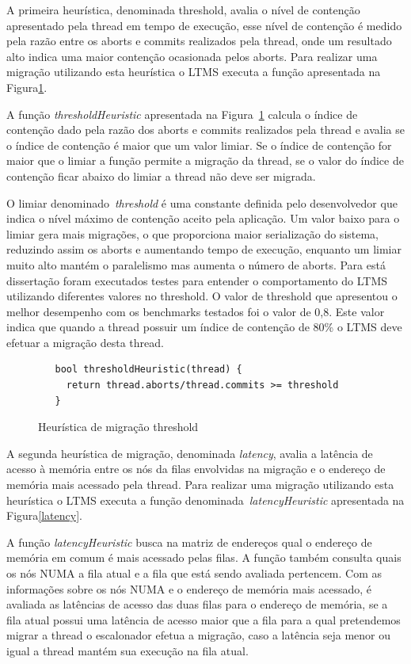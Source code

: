 \documentclass[diss,capa]{texufpel}
\begin{document}
A primeira heurística, denominada threshold, avalia o nível de contenção apresentado pela thread em tempo de execução, esse nível de contenção é medido pela razão entre os aborts e commits realizados pela thread, onde um resultado alto indica uma maior contenção ocasionada pelos aborts. Para realizar uma migração utilizando esta heurística o LTMS executa a função apresentada na Figura\ref{threshold}.

A função \emph{thresholdHeuristic} apresentada na Figura~\ref{threshold} calcula o índice de contenção dado pela razão dos aborts e commits realizados pela thread e avalia se o índice de contenção é maior que um valor limiar. Se o índice de contenção for maior que o limiar a função permite a migração da thread, se o valor do índice de contenção ficar abaixo do limiar a thread não deve ser migrada.

O limiar denominado~\emph{threshold} é uma constante definida pelo desenvolvedor que indica o nível máximo de contenção aceito pela aplicação. Um valor baixo para o limiar gera mais migrações, o que proporciona maior serialização do sistema, reduzindo assim os aborts e aumentando tempo de execução, enquanto um limiar muito alto mantém o paralelismo mas aumenta o número de aborts. Para está dissertação foram executados testes para entender o comportamento do LTMS utilizando diferentes valores no threshold. O valor de threshold que apresentou o melhor desempenho com os benchmarks testados foi o valor de 0,8. Este valor indica que quando a thread possuir um índice de contenção de 80\% o LTMS deve efetuar a migração desta thread.

\begin{figure}[htbp]
 \centering
 \begin{lstlisting}
   bool thresholdHeuristic(thread) {
     return thread.aborts/thread.commits >= threshold
   }
 \end{lstlisting}
 \caption{Heurística de migração threshold}
 \label{threshold}
\end{figure}

A segunda heurística de migração, denominada \emph{latency}, avalia a latência de acesso à memória entre os nós da filas envolvidas na migração e o endereço de memória mais acessado pela thread. Para realizar uma migração utilizando esta heurística o LTMS executa a função denominada~\emph{latencyHeuristic} apresentada na Figura\ref{latency}.

A função \emph{latencyHeuristic} busca na matriz de endereços qual o endereço de memória em comum é mais acessado pelas filas. A função também consulta quais os nós NUMA a fila atual e a fila que está sendo avaliada pertencem. Com as informações sobre os nós NUMA e o endereço de memória mais acessado, é avaliada as latências de acesso das duas filas para o endereço de memória, se a fila atual possui uma latência de acesso maior que a fila para a qual pretendemos migrar a thread o escalonador efetua a migração, caso a latência seja menor ou igual a thread mantém sua execução na fila atual.
\end{document}
